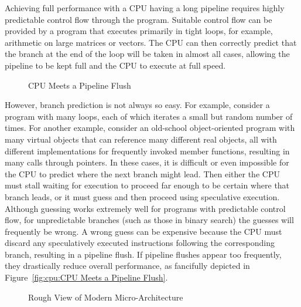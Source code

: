 Achieving full performance with a CPU having a long pipeline requires
highly predictable control flow through the program.
Suitable control flow can be provided by a program that executes primarily
in tight loops, for example, arithmetic on large matrices or vectors.
The CPU can then correctly predict that the branch at the end of the loop
will be taken in almost all cases,
allowing the pipeline to be kept full and the CPU to execute at full speed.

\begin{figure}
\centering
{}
\caption{CPU Meets a Pipeline Flush}
\end{figure}

However, branch prediction is not always so easy.
For example, consider a program with many loops, each of which iterates
a small but random number of times.
For another example, consider an old-school object-oriented program with
many virtual objects that can reference many different real objects, all
with different implementations for frequently invoked member functions,
resulting in many calls through pointers.
In these cases, it is difficult or even
impossible for the CPU to predict where the next branch might lead.
Then either the CPU must stall waiting for execution to proceed far
enough to be certain where that branch leads, or it must guess and
then proceed using speculative execution.
Although guessing works extremely well for programs with predictable
control flow, for unpredictable branches (such as those in binary search)
the guesses will frequently be wrong.
A wrong guess can be expensive because the CPU must discard any
speculatively executed instructions following the corresponding
branch, resulting in a pipeline flush.
If pipeline flushes appear too frequently, they drastically reduce
overall performance, as fancifully depicted in
Figure~\ref{fig:cpu:CPU Meets a Pipeline Flush}.

\begin{figure}
\centering
{}
\caption{Rough View of Modern Micro-Architecture}
\label{fig:cpu:Rough View of Modern Micro-Architecture}
\end{figure}

